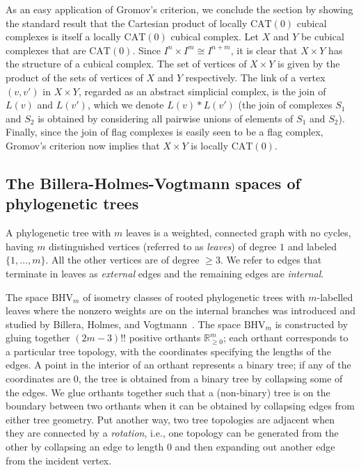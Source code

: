 \documentclass[a4paper,11pt]{article}
\newcommand{\CAT}{\textrm{CAT}}
\newcommand{\BHV}{\textrm{BHV}}
\begin{document}
As an easy application of Gromov's criterion, we conclude the section by showing the standard result that the Cartesian product of locally $\CAT(0)$ cubical complexes is itself a locally $\CAT(0)$ cubical complex.
Let $X$ and $Y$ be cubical complexes that are $\CAT(0)$.
Since $I^n \times I^m \cong I^{n+m}$, it is clear that $X \times Y$ has the structure of a cubical complex.
The set of vertices of $X \times Y$ is given by the product of the sets of vertices of $X$ and $Y$ respectively.
The link of a vertex $(v,v')$ in $X \times Y$, regarded as an abstract simplicial complex, is the join of $L(v)$ and $L(v')$, which we denote $L(v) \ast L(v')$ (the join of complexes $S_1$ and $S_2$ is obtained by considering all pairwise unions of elements of $S_1$ and $S_2$).
Finally, since the join of flag complexes is easily seen to be a flag complex, Gromov's criterion now implies that $X \times Y$ is locally $\CAT(0)$.

\subsection{The Billera-Holmes-Vogtmann spaces of phylogenetic trees}

A phylogenetic tree with $m$ leaves is a weighted, connected graph with no cycles, having $m$ distinguished vertices (referred to as {\em leaves}) of degree $1$ and labeled $\{1, \ldots, m\}$.
All the other vertices are of degree $\geq 3$.
We refer to edges that terminate in leaves as {\em external} edges and the remaining edges are {\em internal}.

The space $\BHV_m$ of isometry classes of rooted phylogenetic trees with $m$-labelled leaves where the nonzero weights are on the internal branches was introduced and studied by Billera, Holmes, and Vogtmann~\cite{billera2001geometry}.
The space $\BHV_m$ is constructed by gluing together $(2m-3)!!$ positive orthants $\mathbb{R}^m_{\geq 0}$; each orthant corresponds to a particular tree
topology, with the coordinates specifying the lengths of the edges.
A point in the interior of an orthant represents a binary tree; if any of the coordinates are $0$, the tree is obtained from a binary tree by collapsing some of the edges.
We glue orthants together such that a (non-binary) tree is on the boundary between two orthants when it can be obtained by collapsing edges from either tree geometry.
Put another way, two tree topologies are adjacent when they are connected by a {\em rotation}, i.e., one topology can be generated from the other by collapsing an edge to length $0$ and then expanding out another edge from the incident vertex.
\end{document}

